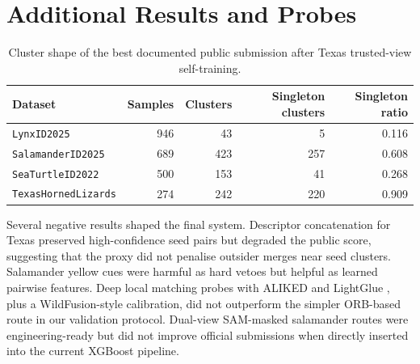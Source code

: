 \documentclass{ceurart}
\newcommand{\dataset}[1]{\texttt{#1}}
\begin{document}
\section{Additional Results and Probes}
\label{app:additional-results}
\begin{table}[h]
  \centering
  \caption{Cluster shape of the best documented public submission after Texas trusted-view self-training.}
  \label{tab:cluster-shape}
  \begin{tabular}{lrrrr}
    \toprule
    Dataset & Samples & Clusters & Singleton clusters & Singleton ratio \\
    \midrule
    \dataset{LynxID2025} & 946 & 43 & 5 & 0.116 \\
    \dataset{SalamanderID2025} & 689 & 423 & 257 & 0.608 \\
    \dataset{SeaTurtleID2022} & 500 & 153 & 41 & 0.268 \\
    \dataset{TexasHornedLizards} & 274 & 242 & 220 & 0.909 \\
    \bottomrule
  \end{tabular}
\end{table}

Several negative results shaped the final system. Descriptor concatenation for Texas preserved high-confidence seed pairs but degraded the public score, suggesting that the proxy did not penalise outsider merges near seed clusters. Salamander yellow cues were harmful as hard vetoes but helpful as learned pairwise features. Deep local matching probes with ALIKED \cite{aliked} and LightGlue \cite{lightglue}, plus a WildFusion-style calibration, did not outperform the simpler ORB-based route in our validation protocol. Dual-view SAM-masked salamander routes were engineering-ready but did not improve official submissions when directly inserted into the current XGBoost pipeline.


\end{document}
